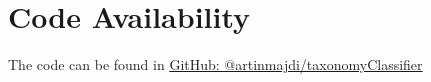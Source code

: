 \documentclass[final,1p,times,authoryear]{elsarticle}
\begin{document}
\section*{Code Availability}
The code can be found in \href{https://github.com/artinmajdi/taxonomyClassifier}{GitHub: @artinmajdi/taxonomyClassifier}



\end{document}
